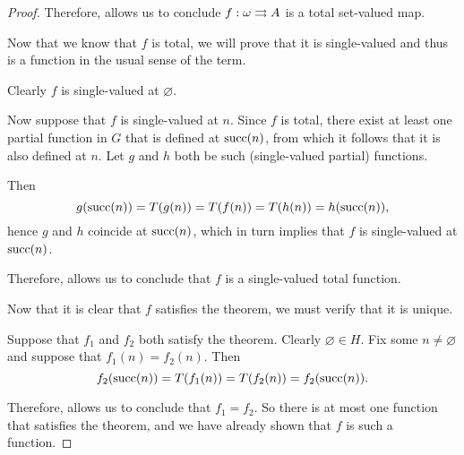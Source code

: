 \begin{proof}
  Therefore,  allows us to conclude \( f: \omega \rightrightarrows A \) is a total set-valued map.

   Now that we know that \( f \) is total, we will prove that it is single-valued and thus is a function in the usual sense of the term.

  Clearly \( f \) is single-valued at \( \varnothing \).

  Now suppose that \( f \) is single-valued at \( n \). Since \( f \) is total, there exist at least one partial function in \( G \) that is defined at \( \operatorname{succ}(n) \), from which it follows that it is also defined at \( n \).  Let \( g \) and \( h \) both be such (single-valued partial) functions.

  Then
  \begin{equation*}
    g(\operatorname{succ}(n)) = T(g(n)) = T(f(n)) = T(h(n)) = h(\operatorname{succ}(n)),
  \end{equation*}
  hence \( g \) and \( h \) coincide at \( \operatorname{succ}(n) \), which in turn implies that \( f \) is single-valued at \( \operatorname{succ}(n) \).

  Therefore,  allows us to conclude that \( f \) is a single-valued total function.

   Now that it is clear that \( f \) satisfies the theorem, we must verify that it is unique.

  Suppose that \( f_1 \) and \( f_2 \) both satisfy the theorem. Clearly \( \varnothing \in H \). Fix some \( n \neq \varnothing \) and suppose that \( f_1(n) = f_2(n) \). Then
  \begin{equation*}
    f_2(\operatorname{succ}(n)) = T(f_1(n)) = T(f_2(n)) = f_2(\operatorname{succ}(n)).
  \end{equation*}

  Therefore,  allows us to conclude that \( f_1 = f_2 \). So there is at most one function that satisfies the theorem, and we have already shown that \( f \) is such a function.
\end{proof}

